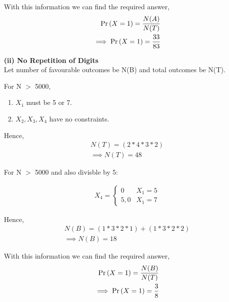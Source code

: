 \documentclass{article}
\begin{document}
With this information we can find the required answer,
\begin{align}
	\Pr\left(X=1\right)=\frac{N(A)}{N(T)}\\
	\implies \Pr\left(X=1\right)=\frac{33}{83}
\end{align}



\textbf{(ii) No Repetition of Digits}\\
Let number of favourable outcomes be N(B) and total outcomes be N(T).

For N $>$ 5000,

\begin{enumerate}
	\item $X_{1}$ must be 5 or 7.\\
	\item $X_{2},X_{3},X_{4}$ have no constraints.
\end{enumerate}

Hence,
\begin{align}
	N(T)=(2*4*3*2) \\
	\implies N(T)=48
\end{align}

For N $>$ 5000 and also divisble by 5:

\begin{align}
	X_{4} = \begin{cases}
		0 & X_{1}=5 \\
		5,0 & X_{1}=7
	\end{cases}
\end{align}

Hence,
\begin{align}
	N(B)=(1*3*2*1)+(1*3*2*2) \\
	\implies N(B)=18
\end{align}

With this information we can find the required answer,
\begin{align}
	\Pr\left(X=1\right)=\frac{N(B)}{N(T)}\\
	\implies \Pr\left(X=1\right)=\frac{3}{8}
\end{align}
\end{document}

